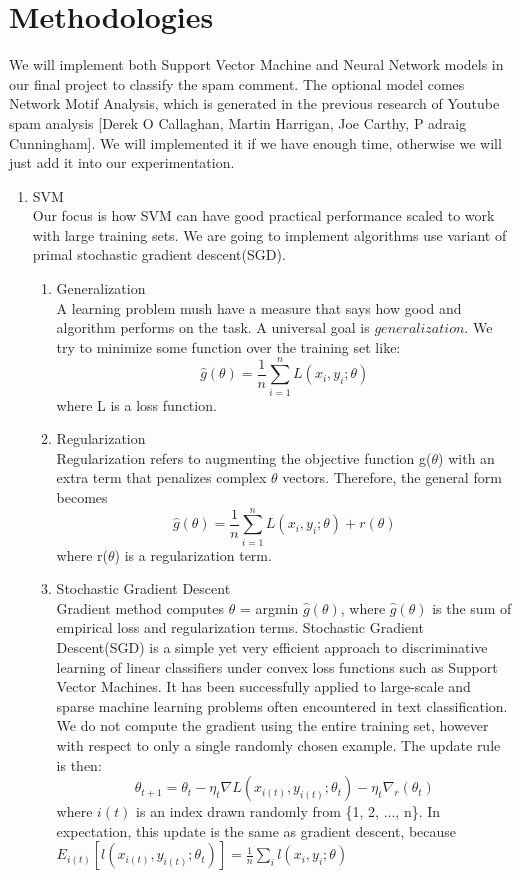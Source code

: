 \documentclass [a4paper, 11pt, oneside, final]{article}
\numberwithin{equation}{section}		%
\numberwithin{figure}{section}			%
\numberwithin{table}{section}				%
\begin{document}
\section{Methodologies}
We will implement both Support Vector Machine and Neural Network models in our final project to classify the spam comment. The optional model comes Network Motif Analysis, which is generated in the previous research of Youtube spam analysis [Derek O Callaghan, Martin Harrigan, Joe Carthy, P adraig Cunningham]. We will implemented it if we have enough time, otherwise we will just add it into our experimentation.
\begin{enumerate}
\item SVM \\
Our focus is how SVM can have good practical performance scaled to work with large training sets. We are going to implement algorithms use variant of primal stochastic gradient descent(SGD).
\begin{enumerate}
\item Generalization \\
A learning problem mush have a measure that says how good and algorithm performs on the task. A universal goal is $generalization$. We try to minimize some function over the training set like: $$\hat{g}(\theta) = \frac{1}{n}\sum_{i=1}^{n} L(x_{i}, y_{i}; \theta)$$ where L is a loss function.

\item Regularization \\
Regularization refers to augmenting the objective function g($\theta$) with an extra term that penalizes complex $\theta$ vectors. Therefore, the general form becomes $$\hat{g}(\theta) = \frac{1}{n}\sum_{i=1}^{n} L(x_{i}, y_{i}; \theta) + r(\theta)$$ where r($\theta$) is a regularization term.

\item Stochastic Gradient Descent \\
Gradient method computes $\theta$ = argmin $\hat{g}(\theta)$, where $\hat{g}(\theta)$ is the sum of empirical loss and regularization terms.
Stochastic Gradient Descent(SGD) is a simple yet very efficient approach to discriminative learning of linear classifiers under convex loss functions such as Support Vector Machines. It has been successfully applied to large-scale and sparse machine learning problems often encountered in text classification. We do not compute the gradient using the entire training set, however with respect to only a single randomly chosen example. The update rule is then:
$$ \theta_{t+1} = \theta_{t} - \eta_{t} \nabla  L(x_{i(t)}, y_{i(t)}; \theta_{t}) - \eta_{t} \nabla_{r}(\theta_{t})$$ where $i(t)$ is an index drawn randomly from \{1, 2, ..., n\}.
In expectation, this update is the same as gradient descent, because $E_{i(t)}[ l(x_{i(t)}, y_{i(t)}; \theta_{t})] =  \frac{1}{n}\sum_{i} l(x_{i}, y_{i}; \theta)$ \\


\end{enumerate}
\end{enumerate}
\end{document}
